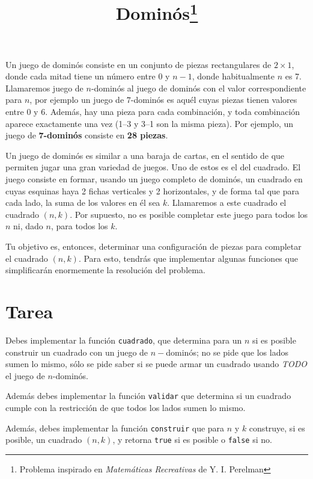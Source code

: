 \documentclass{article}
\title{Dominós\footnote{Problema inspirado en \emph{Matemáticas Recreativas} de Y. I. Perelman}}
\begin{document}
\maketitle

Un juego de dominós consiste en un conjunto de piezas rectangulares de $2\times1$, donde cada mitad tiene un número entre 0 y $n-1$, donde habitualmente $n$ es 7. %
Llamaremos juego de $n$-dominós al juego de dominós con el valor correspondiente para $n$, por ejemplo un juego de $7$-dominós es aquél cuyas piezas tienen valores entre 0 y 6.
Además, hay una pieza para cada combinación, y toda combinación aparece exactamente una vez (1--3 y 3--1 son la misma pieza).
Por ejemplo, un juego de \textbf{7-dominós} consiste en \textbf{28 piezas}.

Un juego de dominós es similar a una baraja de cartas, en el sentido de que permiten jugar una gran variedad de juegos.
Uno de estos es el del cuadrado.
El juego consiste en formar, usando un juego completo de dominós, un cuadrado en cuyas esquinas haya 2 fichas verticales y 2 horizontales, y de forma tal que para cada lado, la suma de los valores en él sea $k$.
Llamaremos a este cuadrado el cuadrado $(n,k)$.
Por supuesto, no es posible completar este juego para todos los $n$ ni, dado $n$, para todos los $k$.

Tu objetivo es, entonces, determinar una configuración de piezas para completar el cuadrado $(n,k)$.
Para esto, tendrás que implementar algunas funciones que simplificarán enormemente la resolución del problema.

\section*{Tarea}

Debes implementar la función \verb+cuadrado+, que determina para un $n$ si es posible construir un cuadrado con un juego de $n-$dominós; no se pide que los lados sumen lo mismo, sólo se pide saber si se puede armar un cuadrado usando \emph{TODO} el juego de $n$-dominós.

Además debes implementar la función \verb+validar+ que determina si un cuadrado cumple con la restricción de que todos los lados sumen lo mismo.

Además, debes implementar la función \verb+construir+ que para $n$ y $k$ construye, si es posible, un cuadrado $(n,k)$, y retorna \verb+true+ si es posible o \verb+false+ si no.
\end{document}
